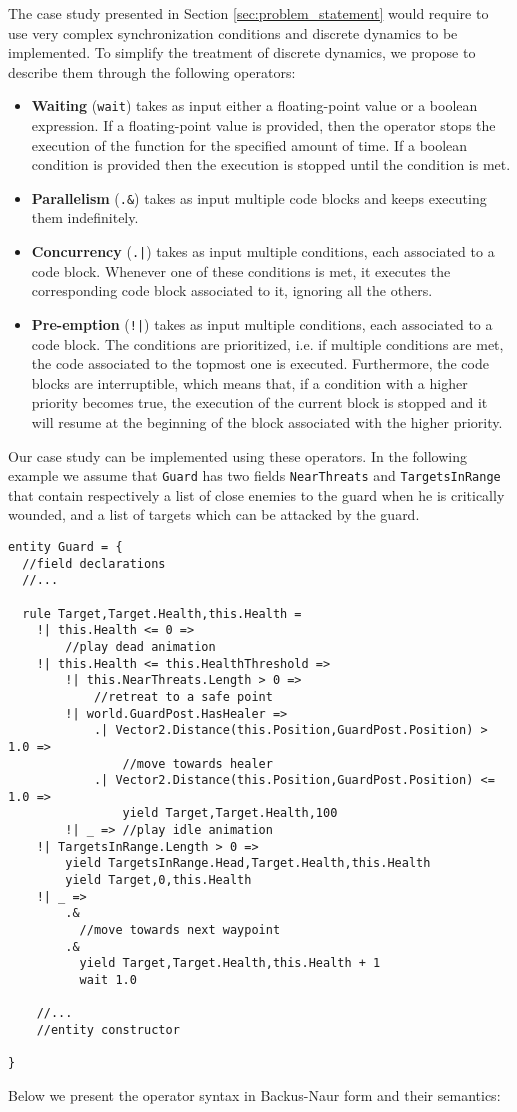The case study presented in Section \ref{sec:problem_statement} would require to use very complex synchronization conditions and discrete dynamics to be implemented. To simplify the treatment of discrete dynamics, we propose to describe them through the following operators:
\begin{itemize}
\item \textbf{Waiting} (\texttt{wait}) takes as input either a floating-point value or a boolean expression. If a floating-point value is provided, then the operator stops the execution of the function for the specified amount of time. If a boolean condition is provided then the execution is stopped until the condition is met.
\item \textbf{Parallelism} (\texttt{.\&}) takes as input multiple code blocks and keeps executing them indefinitely.
\item \textbf{Concurrency} (\texttt{.|}) takes as input multiple conditions, each associated to a code block. Whenever one of these conditions is met, it executes the corresponding code block associated to it, ignoring all the others.
\item \textbf{Pre-emption} (\texttt{!|}) takes as input multiple conditions, each associated to a code block. The conditions are prioritized, i.e. if multiple conditions are met, the code associated to the topmost one is executed. Furthermore, the code blocks are interruptible, which means that, if a condition with a higher priority becomes true, the execution of the current block is stopped and it will resume at the beginning of the block associated with the higher priority.
\end{itemize}

Our case study can be implemented using these operators. In the following example we assume that \texttt{Guard} has two fields \texttt{NearThreats} and \texttt{TargetsInRange} that contain respectively a list of close enemies to the guard when he is critically wounded, and a list of targets which can be attacked by the guard.

\begin{lstlisting}
entity Guard = {
  //field declarations
  //...

  rule Target,Target.Health,this.Health =
    !| this.Health <= 0 =>
        //play dead animation
    !| this.Health <= this.HealthThreshold =>
        !| this.NearThreats.Length > 0 =>
            //retreat to a safe point
        !| world.GuardPost.HasHealer =>
            .| Vector2.Distance(this.Position,GuardPost.Position) > 1.0 =>
                //move towards healer
            .| Vector2.Distance(this.Position,GuardPost.Position) <= 1.0 =>
                yield Target,Target.Health,100
        !| _ => //play idle animation
    !| TargetsInRange.Length > 0 =>
        yield TargetsInRange.Head,Target.Health,this.Health
        yield Target,0,this.Health
    !| _ => 
        .&
          //move towards next waypoint
        .&
          yield Target,Target.Health,this.Health + 1
          wait 1.0
    
    //...
    //entity constructor

}
\end{lstlisting}
Below we present the operator syntax in Backus-Naur form and their semantics:

